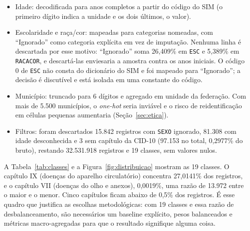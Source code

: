 \documentclass[12pt]{article}
\begin{document}
\begin{itemize}
  \item Idade: decodificada para anos completos a partir do código do SIM (o primeiro dígito indica a unidade e os dois últimos, o valor).
  \item Escolaridade e raça/cor: mapeadas para categorias nomeadas, com ``Ignorado'' como categoria explícita em vez de imputação. Nenhuma linha é descartada por esse motivo: ``Ignorado'' soma 26,409\% em \texttt{ESC} e 5,389\% em \texttt{RACACOR}, e descartá-las enviesaria a amostra contra os anos iniciais. O código 0 de \texttt{ESC} não consta do dicionário do SIM e foi mapeado para ``Ignorado''; a decisão é discutível e está isolada em uma constante do código.
  \item Município: truncado para 6 dígitos e agregado em unidade da federação. Com mais de 5.500 municípios, o \emph{one-hot} seria inviável e o risco de reidentificação em células pequenas aumentaria (Seção~\ref{sec:etica}).
  \item Filtros: foram descartados 15.842 registros com \texttt{SEXO} ignorado, 81.308 com idade desconhecida e 3 sem capítulo da CID-10 (97.153 no total, 0,2977\% do bruto), restando 32.531.918 registros e 19 classes, sem valores nulos.
\end{itemize}

A Tabela~\ref{tab:classes} e a Figura~\ref{fig:distribuicao} mostram as 19 classes. O capítulo IX (doenças do aparelho circulatório) concentra 27,0141\% dos registros, e o capítulo VII (doenças do olho e anexos), 0,0019\%, uma razão de 13.972 entre o maior e o menor. Cinco capítulos ficam abaixo de 0,5\% dos registros. É esse quadro que justifica as escolhas metodológicas: com 19 classes e essa razão de desbalanceamento, são necessários um baseline explícito, pesos balanceados e métricas macro-agregadas para que o resultado signifique alguma coisa.
\end{document}
